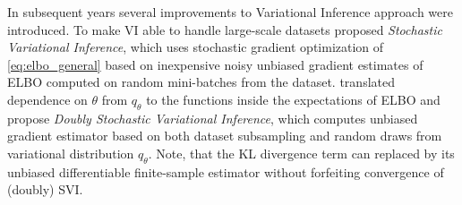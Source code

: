 \documentclass[a4paper,10pt,twocolumn]{article}
\begin{document}
In subsequent years several improvements to Variational Inference approach were introduced.
To make VI able to handle large-scale datasets \citet{hoffman_stochastic_2013} proposed
\emph{Stochastic Variational Inference}, which uses stochastic gradient optimization of
\eqref{eq:elbo_general} based on inexpensive noisy unbiased gradient estimates of ELBO
computed on random mini-batches from the dataset. \citet{titsias_doubly_2014} translated
dependence on $\theta$ from $q_{\theta}$ to the functions inside the expectations of ELBO
and propose \emph{Doubly Stochastic Variational Inference}, which computes unbiased gradient
estimator based on both dataset subsampling and random draws from variational distribution
$q_{\theta}$. Note, that the KL divergence term can replaced by its unbiased differentiable
finite-sample estimator without forfeiting convergence of (doubly) SVI.
\end{document}
